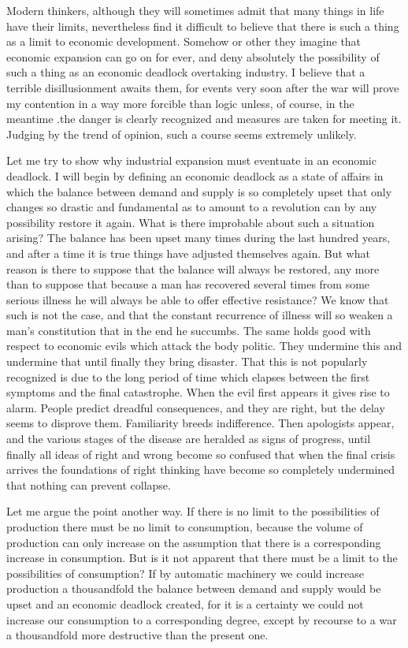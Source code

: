 \documentclass{book}
\begin{document}
Modern thinkers, although they will sometimes admit that many things in life have their limits, nevertheless find it difficult to believe that there is such a thing as a limit to economic development. Somehow or other they imagine that economic expansion can go on for ever, and deny absolutely the possibility of such a thing as an economic deadlock overtaking industry. I believe that a terrible disillusionment awaits them, for events very soon after the war will prove my contention in a way more forcible than logic unless, of course, in the meantime .the danger is clearly recognized and measures are taken for meeting it. Judging by the trend of opinion, such a course seems extremely unlikely.

Let me try to show why industrial expansion must eventuate in an economic deadlock. I will begin by defining an economic deadlock as a state of affairs in which the balance between demand and supply is so completely upset that only changes so drastic and fundamental as to amount to a revolution can by any possibility restore it again. What is there improbable about such a situation arising? The balance has been upset many times during the last hundred years, and after a time it is true things have adjusted themselves again. But what reason is there to suppose that the balance will always be restored, any more than to suppose that because a man has recovered several times from some serious illness he will always be able to offer effective resistance? We know that such is not the case, and that the constant recurrence of illness will so weaken a man’s constitution that in the end he succumbs. The same holds good with respect to economic evils which attack the body politic. They undermine this and undermine that until finally they bring disaster. That this is not popularly recognized is due to the long period of time which elapses between the first symptoms and the final catastrophe. When the evil first appears it gives rise to alarm. People predict dreadful consequences, and they are right, but the delay seems to disprove them. Familiarity breeds indifference. Then apologists appear, and the various stages of the disease are heralded as signs of progress, until finally all ideas of right and wrong become so confused that when the final crisis arrives the foundations of right thinking have become so completely undermined that nothing can prevent collapse.

Let me argue the point another way. If there is no limit to the possibilities of production there must be no limit to consumption, because the volume of production can only increase on the assumption that there is a corresponding increase in consumption. But is it not apparent that there must be a limit to the possibilities of consumption? If by automatic machinery we could increase production a thousandfold the balance between demand and supply would be upset and an economic deadlock created, for it is a certainty we could not increase our consumption to a corresponding degree, except by recourse to a war a thousandfold more destructive than the present one.
\end{document}
